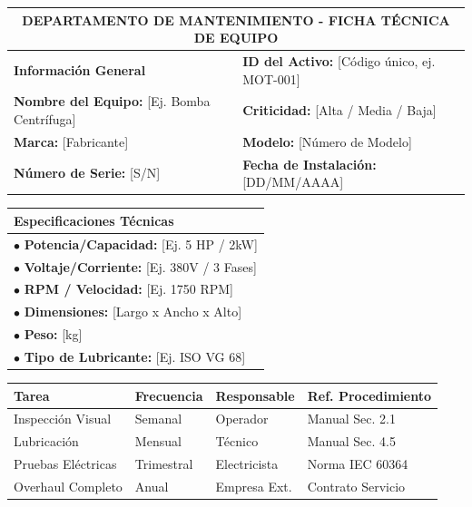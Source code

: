 \documentclass[../main]{subfiles}
\begin{document}
\begin{center}
\begin{tabular}{|p{}|p{}|}
\hline
\multicolumn{2}{|c|}{\textbf{DEPARTAMENTO DE MANTENIMIENTO - FICHA TÉCNICA DE EQUIPO}} \\ \hline
\textbf{Información General} & \textbf{ID del Activo:} [Código único, ej. MOT-001] \\ \hline
\textbf{Nombre del Equipo:} [Ej. Bomba Centrífuga] & \textbf{Criticidad:} [Alta / Media / Baja] \\ \hline
\textbf{Marca:} [Fabricante] & \textbf{Modelo:} [Número de Modelo] \\ \hline
\textbf{Número de Serie:} [S/N] & \textbf{Fecha de Instalación:} [DD/MM/AAAA] \\ \hline
\end{tabular}

\vspace{0.3cm}

\begin{tabular}{|p{}|}
\hline
\textbf{Especificaciones Técnicas} \\ \hline
$\bullet$ \textbf{Potencia/Capacidad:} [Ej. 5 HP / 2kW] \\ 
$\bullet$ \textbf{Voltaje/Corriente:} [Ej. 380V / 3 Fases] \\ 
$\bullet$ \textbf{RPM / Velocidad:} [Ej. 1750 RPM] \\ 
$\bullet$ \textbf{Dimensiones:} [Largo x Ancho x Alto] \\ 
$\bullet$ \textbf{Peso:} [kg] \\ 
$\bullet$ \textbf{Tipo de Lubricante:} [Ej. ISO VG 68] \\ \hline
\end{tabular}

\vspace{0.3cm}

\begin{tabular}{|p{}|p{}|p{}|p{}|}
\hline
\textbf{Tarea} & \textbf{Frecuencia} & \textbf{Responsable} & \textbf{Ref. Procedimiento} \\ \hline
Inspección Visual & Semanal & Operador & Manual Sec. 2.1 \\ \hline
Lubricación & Mensual & Técnico & Manual Sec. 4.5 \\ \hline
Pruebas Eléctricas & Trimestral & Electricista & Norma IEC 60364 \\ \hline
Overhaul Completo & Anual & Empresa Ext. & Contrato Servicio \\ \hline
\end{tabular}


\end{center}
\end{document}
